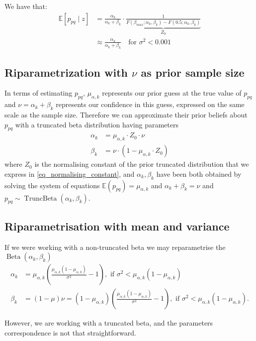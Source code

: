 \documentclass[11pt]{amsart}
\begin{document}
We have that:
\begin{align}
\mathbb{E}\left[p_{pq}\mid z\right]&= \frac{\alpha_k}{\alpha_k + \beta_k} \cdot \underbrace{\frac{1}{F(\beta_{max};\alpha_k, \beta_k) - F(0.5;\alpha_k, \beta_k)}}_{Z_0}\nonumber \\ 
&\approx \frac{\alpha_k}{\alpha_k + \beta_k} \quad \text{for } \sigma^2 <0.001
\end{align}

\subsection{Riparametrization with $\nu$ as prior sample size}
In terms of estimating $p_{pq}$, $\mu_{\alpha,k}$ represents our prior guess at the true value of $p_{pq}$ and $\nu = \alpha_k + \beta_k$ represents our confidence in this guess, expressed on the same scale as the sample size. Therefore we can approximate their prior beliefs about $p_{pq}$ with a truncated beta distribution having parameters 
\begin{align}
\alpha_k& =\mu_{\alpha,k}\cdot Z_0 \cdot \nu \nonumber \\
\beta_k &= \nu\cdot \left(1-\mu_{\alpha,k}\cdot Z_0\right)
\end{align}
where $Z_0$ is the normalising constant of the prior truncated distribution that we express in \eqref{eq_normalising_constant}, and $\alpha_k,
\beta_k$ have been both obtained by solving the system of equations $\mathbb{E}\left(p_{pq} \right) = \mu_{\alpha,k}$ and $\alpha_k+\beta_k = \nu$ and $p_{pq}\sim \operatorname{TruncBeta}\left(\alpha_k, \beta_k\right)$.

\subsection{Riparametrisation with mean and variance}

If we were working with a non-truncated beta we may reparametrise the $\operatorname{Beta}\left(\alpha_k,\beta_k\right)$
\begin{align}
\alpha_k&=\mu_{\alpha,k} \left(\frac{\mu_{\alpha,k}(1-\mu_{\alpha,k})}{\sigma^2}-1\right), \text{ if } \sigma^2< \mu_{\alpha,k}(1-\mu_{\alpha,k})\\
\beta_k &= (1 - \mu) \nu = (1 - \mu_{\alpha,k})\left(\frac{\mu_{\alpha,k}(1-\mu_{\alpha,k})}{\sigma^2}-1\right), \text{ if }\sigma^2< \mu_{\alpha,k}(1-\mu_{\alpha,k}).
\end{align}

However, we are working with a truncated beta, and the parameters correspondence is not that straightforward.
\end{document}
